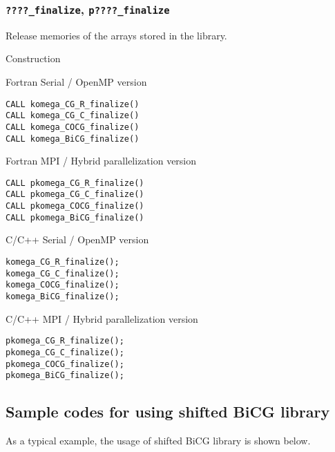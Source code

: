 \documentclass[12pt,titlepage]{article}
\begin{document}
\subsubsection{\texttt{????\_finalize}, \texttt{p????\_finalize}}

Release memories of the arrays stored in the library.

\noindent Construction

\noindent Fortran Serial / OpenMP version
\begin{verbatim}
CALL komega_CG_R_finalize()
CALL komega_CG_C_finalize()
CALL komega_COCG_finalize()
CALL komega_BiCG_finalize()
\end{verbatim}

\noindent Fortran MPI / Hybrid parallelization version
\begin{verbatim}
CALL pkomega_CG_R_finalize()
CALL pkomega_CG_C_finalize()
CALL pkomega_COCG_finalize()
CALL pkomega_BiCG_finalize()
\end{verbatim}

\noindent C/C++ Serial / OpenMP version
\begin{verbatim}
komega_CG_R_finalize();
komega_CG_C_finalize();
komega_COCG_finalize();
komega_BiCG_finalize();
\end{verbatim}

\noindent C/C++ MPI / Hybrid parallelization version
\begin{verbatim}
pkomega_CG_R_finalize();
pkomega_CG_C_finalize();
pkomega_COCG_finalize();
pkomega_BiCG_finalize();
\end{verbatim}


\subsection{Sample codes for using shifted BiCG library}

As a typical example, the usage of shifted BiCG library is shown below.
\end{document}
